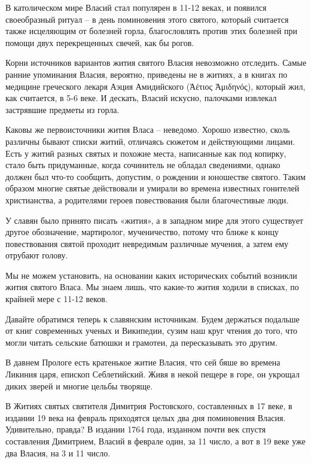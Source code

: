    В католическом мире Власий стал популярен в 11-12 веках, и появился своеобразный ритуал – в день поминовения этого святого, который считается также исцеляющим от болезней горла, благословлять против этих болезней при помощи двух перекрещенных свечей, как бы рогов.

   Корни источников вариантов жития святого Власия невозможно отследить. Самые ранние упоминания Власия, вероятно, приведены не в житиях, а в книгах по медицине греческого лекаря Аэция Амидийского (Ἀέτιος Ἀμιδηνός), который жил, как считается, в 5-6 веке. И дескать, Власий искусно, палочками извлекал застрявшие предметы из горла.

   Каковы же первоисточники жития Власа – неведомо. Хорошо известно, сколь различны бывают списки житий, отличаясь сюжетом и действующими лицами. Есть у житий разных святых и похожие места, написанные как под копирку, стало быть придуманные, когда сочинитель не обладал сведениями, однако должен был что-то сообщить, допустим, о рождении и юношестве святого. Таким образом многие святые действовали и умирали во времена известных гонителей христианства, а родителями героев повествования были благочестивые люди. 

   У славян было принято писать «жития», а в западном мире для этого существует другое обозначение, мартиролог, мученичество, потому что ближе к концу повествования святой проходит невредимым различные мучения, а затем ему отрубают голову. 

    Мы не можем установить, на основании каких исторических событий возникли жития святого Власа. Мы знаем лишь, что какие-то жития ходили в списках, по крайней мере с 11-12 веков.

   Давайте обратимся теперь к славянским источникам. Будем держаться подальше от книг современных ученых и Википедии, сузим наш круг чтения до того, что могли читать сельские батюшки и грамотеи, да пересказывать это другим.

   В давнем Прологе есть кратенькое житие Власия, что сей бяше во времена Ликиния царя, епископ Себлетийский. Живя в некой пещере в горе, он укрощал диких зверей и многие цельбы творяще.

   В Житиях святых святителя Димитрия Ростовского, составленных в 17 веке, в издании 19 века на февраль приходятся целых два дня поминовения Власия. Удивительно, правда? В издании 1764 года, изданном почти век спустя составления Димитрием, Власий в феврале один, за 11 число, а вот в 19 веке уже два Власия, на 3 и 11 число.

